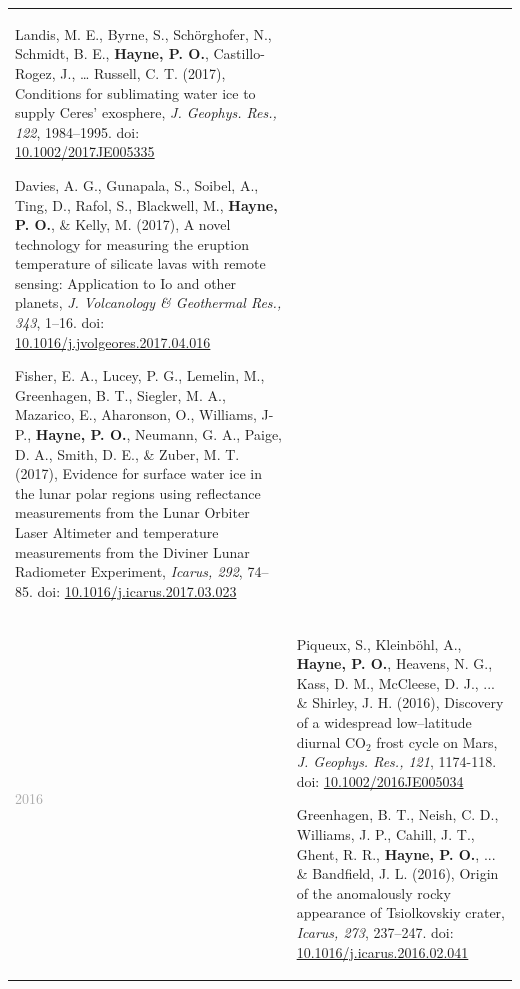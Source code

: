 \documentclass[letterpaper,10pt,twoside]{article}
\begin{document}
\begin{longtable}{@{} p{} p{}}
\begin{enumerate}[leftmargin=!,labelindent=2.5pt,itemindent=-10pt]
{             \item Landis, M. E., Byrne, S., Schörghofer, N., Schmidt, B. E., \textbf{Hayne, P. O.}, Castillo-Rogez, J., … Russell, C. T. (2017), Conditions for sublimating water ice to supply Ceres' exosphere, \textit{J. Geophys. Res., 122}, 1984--1995. doi: \href{https://doi.org/10.1002/2017JE005335}{10.1002/2017JE005335}
    
            \item Davies, A. G., Gunapala, S., Soibel, A., Ting, D., Rafol, S., Blackwell, M., \textbf{Hayne, P. O.}, \& Kelly, M. (2017), A novel technology for measuring the eruption temperature of silicate lavas with remote sensing: Application to Io and other planets, \textit{J. Volcanology \& Geothermal Res., 343}, 1--16. doi: \href{http://dx.doi.org/10.1016/j.jvolgeores.2017.04.016}{10.1016/j.jvolgeores.2017.04.016}
    
            \item Fisher, E. A., Lucey, P. G., Lemelin, M., Greenhagen, B. T., Siegler, M. A., Mazarico, E., Aharonson, O., Williams, J-P., \textbf{Hayne, P. O.}, Neumann, G. A., Paige, D. A., Smith, D. E., \& Zuber, M. T. (2017), Evidence for surface water ice in the lunar polar regions using reflectance measurements from the Lunar Orbiter Laser Altimeter and temperature measurements from the Diviner Lunar Radiometer Experiment, \textit{Icarus, 292}, 74--85. doi: \href{https://doi.org/10.1016/j.icarus.2017.03.023}{10.1016/j.icarus.2017.03.023}
            }
            \end{enumerate} \\
            
    \textcolor{darkgray}{2016}   & \begin{enumerate}[leftmargin=!,labelindent=2.5pt,itemindent=-10pt]\setcounter{enumi}{83}
            {\small
            \item Piqueux, S., Kleinb{\"o}hl, A., {\bf Hayne, P. O.}, Heavens, N. G., Kass, D. M., McCleese, D. J., ... \& Shirley, J. H. (2016), Discovery of a widespread low--latitude diurnal CO$_2$ frost cycle on Mars, {\it J. Geophys. Res., 121}, 1174-118. doi: \href{https://doi.org/10.1002/2016JE005034}{10.1002/2016JE005034}
    
            \item Greenhagen, B. T., Neish, C. D., Williams, J. P., Cahill, J. T., Ghent, R. R., {\bf Hayne, P. O.}, ... \& Bandfield, J. L. (2016), Origin of the anomalously rocky appearance of Tsiolkovskiy crater, {\it Icarus, 273}, 237--247. doi: \href{https://doi.org/10.1016/j.icarus.2016.02.041}{10.1016/j.icarus.2016.02.041}
    
}
\end{enumerate}
\end{longtable}
\end{document}
